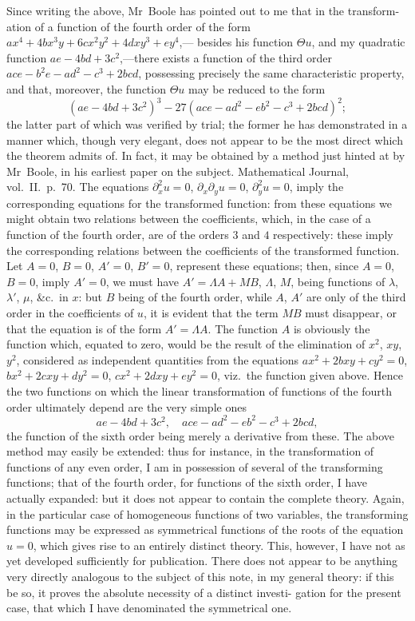 \documentclass[11pt,a4paper]{book}
\begin{document}
Since writing the above, Mr~Boole has pointed out to me that in the transform-
ation of a function of the fourth order of the form $ax^4 + 4bx^3y + 6cx^2y^2 + 4dxy^3 + ey^4$,---
besides his function $\Theta u$, and my quadratic function $ae - 4bd + 3c^2$,---there exists a
function of the third order $ace - b^2e - ad^2 - c^3 + 2bcd$, possessing precisely the same
characteristic property, and that, moreover, the function $\Theta u$ may be reduced to the form
\[
(ae - 4bd + 3c^2)^3 - 27(ace - ad^2 - eb^2 - c^3 + 2bcd)^2;
\]
the latter part of which was verified by trial; the former he has demonstrated in a
manner which, though very elegant, does not appear to be the most direct which the
theorem admits of. In fact, it may be obtained by a method just hinted at by
Mr~Boole, in his earliest paper on the subject. Mathematical Journal, vol.~II.\ p.~70.
The equations $\partial_x^2 u = 0$, $\partial_x\partial_y u = 0$, $\partial_y^2 u = 0$, imply the corresponding equations for the
transformed function: from these equations we might obtain two relations between
the coefficients, which, in the case of a function of the fourth order, are of the orders $3$
and $4$ respectively: these imply the corresponding relations between the coefficients of
the transformed function. Let $A=0$, $B=0$, $A'=0$, $B'=0$, represent these equations;
then, since $A=0$, $B=0$, imply $A'=0$, we must have $A' = \Lambda A + MB$, $\Lambda$, $M$, being
functions of $\lambda$, $\lambda'$, $\mu$, \&c.\ in $x$: but $B$ being of the fourth order, while $A$, $A'$ are only of
the third order in the coefficients of $u$, it is evident that the term $MB$ must disappear,
or that the equation is of the form $A' = \Lambda A$. The function $A$ is obviously the function
which, equated to zero, would be the result of the elimination of $x^2$, $xy$, $y^2$, considered
as independent quantities from the equations $ax^2 + 2bxy + cy^2 = 0$, $bx^2 + 2cxy + dy^2 = 0$,
$cx^2 + 2dxy + ey^2 = 0$, viz.\ the function given above. Hence the two functions on which
the linear transformation of functions of the fourth order ultimately depend are the
very simple ones
\[
ae - 4bd + 3c^2, \quad ace - ad^2 - eb^2 - c^3 + 2bcd,
\]
the function of the sixth order being merely a derivative from these. The above
method may easily be extended: thus for instance, in the transformation of functions of
any even order, I am in possession of several of the transforming functions; that of the
fourth order, for functions of the sixth order, I have actually expanded: but it does not
appear to contain the complete theory. Again, in the particular case of homogeneous
functions of two variables, the transforming functions may be expressed as symmetrical
functions of the roots of the equation $u = 0$, which gives rise to an entirely distinct
theory. This, however, I have not as yet developed sufficiently for publication. There
does not appear to be anything very directly analogous to the subject of this note, in
my general theory: if this be so, it proves the absolute necessity of a distinct investi-
gation for the present case, that which I have denominated the symmetrical one.
\end{document}
